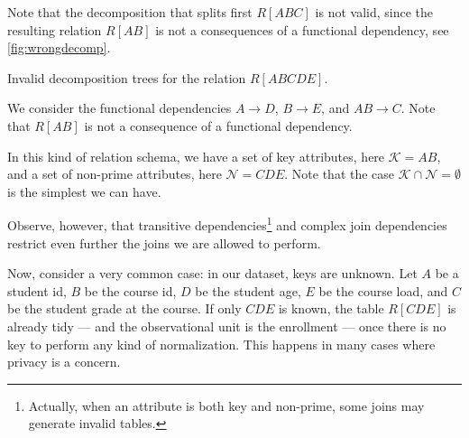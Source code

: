 Note that the decomposition that splits first $R[ABC]$ is not valid, since the resulting
relation $R[AB]$ is not a consequences of a functional dependency, see
\cref{fig:wrongdecomp}.

\begin{figurebox}[label=fig:wrongdecomp]{Invalid decomposition trees for the relation $R[ABCDE]$.}
  \centering
  \tcblower
  We consider the functional dependencies $A \to D$, $B \to E$, and $AB \to C$.
  Note that $R[AB]$ is not a consequence of a functional dependency.
\end{figurebox}

In this kind of relation schema, we have a set of key attributes, here $\mathcal{K} = AB$,
and a set of non-prime attributes, here $\mathcal{N} = CDE$.  Note that the case
$\mathcal{K} \cap \mathcal{N} = \emptyset$ is the simplest we can have.

Observe, however, that transitive dependencies\footnote{Actually, when an attribute is
both key and non-prime, some joins may generate invalid tables.} and complex join
dependencies restrict even further the joins we are allowed to perform.

Now, consider a very common case: in our dataset, keys are unknown.  Let $A$ be a student
id, $B$ be the course id, $D$ be the student age, $E$ be the course load, and $C$ be the
student grade at the course.  If only $CDE$ is known, the table $R[CDE]$ is already tidy
--- and the observational unit is the enrollment --- once there is no key to perform any
kind of normalization.  This happens in many cases where privacy is a concern.

